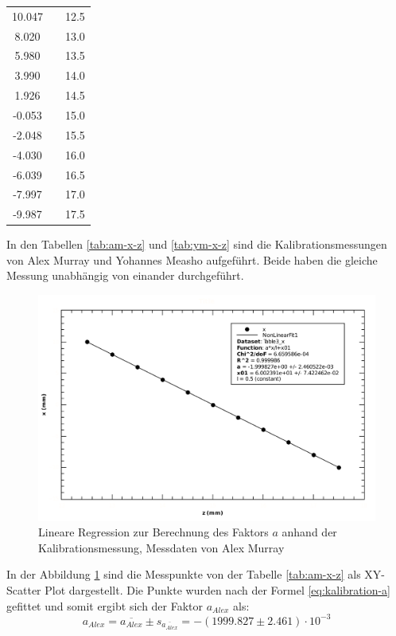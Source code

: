 \begin{table}[H]
\begin{subtable}{.5\linewidth}
\begin{tabular}{ccc}
            10.047 && 12.5 \\
            8.020  && 13.0 \\
            5.980  && 13.5 \\
            3.990  && 14.0 \\
            1.926  && 14.5 \\
            -0.053 && 15.0 \\
            -2.048 && 15.5 \\
            -4.030 && 16.0 \\
            -6.039 && 16.5 \\
            -7.997 && 17.0 \\
            -9.987 && 17.5 \\
           \bottomrule
        \end{tabular}
    \end{subtable}
\end{table}

In    den   Tabellen   \ref{tab:am-x-z}   und    \ref{tab:ym-x-z}    sind    die
Kalibrationsmessungen von Alex Murray  und  Yohannes  Measho aufgef\"uhrt. Beide
haben   die   gleiche   Messung   unabh\"angig  von   einander   durchgef\"uhrt.

\begin{figure}[H]
    \center
    \includegraphics[width=.8\textwidth]{images/am-x-z-fit-a.pdf}
    \caption{Lineare Regression zur Berechnung des Faktors $a$ anhand der Kalibrationsmessung, Messdaten von Alex Murray}
    \label{fig:am-x-z-fit-a}
\end{figure}

In der Abbildung \ref{fig:am-x-z-fit-a}  sind  die  Messpunkte  von  der Tabelle
\ref{tab:am-x-z} als XY-Scatter Plot dargestellt.  Die  Punkte  wurden  nach der
Formel  \ref{eq:kalibration-a}   gefittet  und  somit  ergibt  sich  der  Faktor
$a_{Alex}$ als:
\begin{equation}
    a_{Alex} = \overline{a_{Alex}} \pm s_{\overline{a_{Alex}}} = -(1999.827 \pm 2.461)\cdot 10^{-3}
    \label{eq:am-a}
\end{equation}


